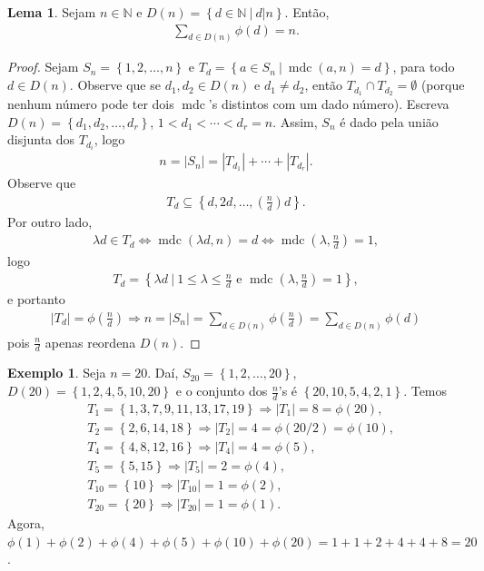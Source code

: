 \documentclass[a4paper,11pt,twoside, leqno]{article}
\DeclareMathOperator{\mdc}{mdc}
\theoremstyle{definition}
\newtheorem{lemma}[theorem]{Lema}
\newtheorem*{example}{Exemplo}
\begin{document}
\begin{lemma}
	\label{lema 56}
	Sejam $n\in\mathbb{N}$ e $D(n) = \left\{ d\in\mathbb{N} \ \big| \ d|n \right\}$. Então,
	\begin{align*}
	\sum_{d\in D(n)} \phi(d) = n.
	\end{align*}
\end{lemma}
\begin{proof}
	Sejam $S_n = \left\{ 1,2,\dots,n \right\}$ e $T_d = \left\{ a\in S_n \ | \ \mdc(a,n) = d \right\}$, para todo $d\in D(n)$. Observe que se $d_1, d_2\in D(n)$ e $d_1\neq d_2$, então $T_{d_1}\cap T_{d_2} = \emptyset$ (porque nenhum número pode ter dois $\mdc$'s distintos com um dado número). Escreva $D(n) = \left\{ d_1, d_2, \dots, d_r \right\}$, $1 < d_1 < \cdots < d_r = n$. Assim, $S_n$ é dado pela união disjunta dos $T_{d_i}$, logo
	\begin{align*}
	n = |S_n| = |T_{d_1}| + \cdots + |T_{d_r}|.
	\end{align*}
	Observe que 
	\begin{align*}
	T_d \subseteq \left\{ d, 2d, \dots, \left( \frac{n}{d}\right)d \right\}.
	\end{align*}
	Por outro lado, 
	\begin{align*}
	\lambda d\in T_d \Leftrightarrow \mdc(\lambda d, n) = d \Leftrightarrow \mdc\left( \lambda, \frac{n}{d} \right) = 1,
	\end{align*}
	logo 
	\begin{align*}
	T_d = \left\{ \lambda d \ | \ 1\leq \lambda\leq \frac{n}{d} \text{ e } \mdc\left( \lambda, \frac{n}{d} \right) = 1 \right\},
	\end{align*}
	e portanto
	\begin{align*}
	|T_d| = \phi\left( \frac{n}{d} \right) \Rightarrow n = |S_n| = \sum_{d\in D(n)}\phi\left( \frac{n}{d} \right) = \sum_{d\in D(n)}\phi\left( d \right)
	\end{align*}
	pois $\displaystyle{\frac{n}{d}}$ apenas reordena $D(n).$
\end{proof}
\begin{example}
	Seja $n = 20$. Daí, $S_{20} = \left\{ 1,2,\dots,20 \right\}$, $D(20) = \left\{ 1,2,4,5,10,20 \right\}$ e o conjunto dos $\displaystyle{\frac{n}{d}}$'s é $\left\{ 20,10,5,4,2,1 \right\}$. Temos
	\begin{align*}
	&T_1 = \left\{ 1,3,7,9,11,13,17,19 \right\} \Rightarrow |T_1| = 8 = \phi(20), \\
	&T_2 = \left\{ 2,6,14,18 \right\} \Rightarrow |T_2| = 4 = \phi(20/2) = \phi(10), \\
	&T_4 = \left\{ 4,8,12,16 \right\} \Rightarrow |T_4| = 4 = \phi(5), \\
	&T_5 = \left\{ 5,15 \right\} \Rightarrow |T_5| = 2 = \phi(4), \\
	&T_{10} = \left\{ 10 \right\} \Rightarrow |T_{10}| = 1 = \phi(2), \\
	&T_{20} = \left\{ 20 \right\} \Rightarrow |T_{20}| = 1 = \phi(1).
	\end{align*}
	Agora, $\phi(1) + \phi(2) + \phi(4) + \phi(5) + \phi(10) + \phi(20) = 1 + 1 + 2 + 4 + 4 + 8 = 20$.
\end{example}
\end{document}
